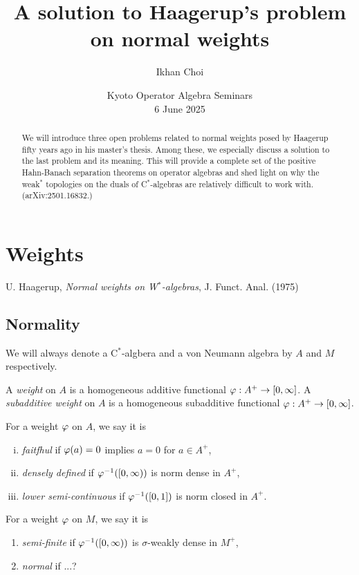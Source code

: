 \documentclass{../../../../small}
\begin{document}
\title{A solution to Haagerup's problem on normal weights}
\author{Ikhan Choi}
\date{Kyoto Operator Algebra Seminars\\6 June 2025}
\maketitle

\begin{abstract}
We will introduce three open problems related to normal weights posed by Haagerup fifty years ago in his master's thesis. Among these, we especially discuss a solution to the last problem and its meaning. This will provide a complete set of the positive Hahn-Banach separation theorems on operator algebras and shed light on why the weak$^*$ topologies on the duals of C$^*$-algebras are relatively difficult to work with. (arXiv:2501.16832.)
\end{abstract}

\tableofcontents
\thispagestyle{empty}
\addtocounter{page}{-1}

\newpage
\section{Weights}

U. Haagerup, \emph{Normal weights on W$^*$-algebras}, J. Funct. Anal. (1975)

\subsection{Normality}

We will always denote a C$^*$-algbera and a von Neumann algebra by $A$ and $M$ respectively.

\begin{definition*}
A \emph{weight} on $A$ is a homogeneous additive functional $\varphi:A^+\to[0,\infty]$.
A \emph{subadditive weight} on $A$ is a homogeneous subadditive functional $\varphi:A^+\to[0,\infty]$.
\end{definition*}

\begin{definition*}
For a weight $\varphi$ on $A$, we say it is
\begin{enumerate}[(i)]
\item \emph{faitfhul} if $\varphi(a)=0$ implies $a=0$ for $a\in A^+$,
\item \emph{densely defined} if $\varphi^{-1}([0,\infty))$ is norm dense in $A^+$,
\item \emph{lower semi-continuous} if $\varphi^{-1}([0,1])$ is norm closed in $A^+$.
\end{enumerate}
For a weight $\varphi$ on $M$, we say it is
\begin{enumerate}
\item[(ii')] \emph{semi-finite} if $\varphi^{-1}([0,\infty))$ is $\sigma$-weakly dense in $M^+$,
\item[(iii')] \emph{normal} if ...?
\end{enumerate}
\end{definition*}
\end{document}
